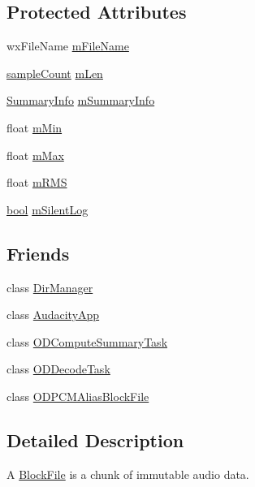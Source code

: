 \subsection*{Protected Attributes}
\begin{DoxyCompactItemize}
\item 
wx\+File\+Name \hyperlink{class_block_file_ab4d7e450d154ad4ccee1d0f4a26093f0}{m\+File\+Name}
\item 
\hyperlink{include_2audacity_2_types_8h_afa427e1f521ea5ec12d054e8bd4d0f71}{sample\+Count} \hyperlink{class_block_file_a732a85cd5906a03310bd23fc91b83d40}{m\+Len}
\item 
\hyperlink{class_summary_info}{Summary\+Info} \hyperlink{class_block_file_a4c81c30a570684d5287ed58acd3da259}{m\+Summary\+Info}
\item 
float \hyperlink{class_block_file_a733757c3a2c9d2e51beab8acbc86f913}{m\+Min}
\item 
float \hyperlink{class_block_file_abda14ef73ea31a585b26e289a99ac356}{m\+Max}
\item 
float \hyperlink{class_block_file_a9b863f624b2d76a5ec29390cebed698f}{m\+R\+MS}
\item 
\hyperlink{mac_2config_2i386_2lib-src_2libsoxr_2soxr-config_8h_abb452686968e48b67397da5f97445f5b}{bool} \hyperlink{class_block_file_a670ed2ad2e13a94e3fb7c2ae32785811}{m\+Silent\+Log}
\end{DoxyCompactItemize}
\subsection*{Friends}
\begin{DoxyCompactItemize}
\item 
class \hyperlink{class_block_file_a0db96e19e318fc03ec706babee75be8f}{Dir\+Manager}
\item 
class \hyperlink{class_block_file_a45d40c2ff4be49563fffa62069e89e7f}{Audacity\+App}
\item 
class \hyperlink{class_block_file_a24c4db9b12ac4619d1b2a0966f0e756c}{O\+D\+Compute\+Summary\+Task}
\item 
class \hyperlink{class_block_file_aee4dd21db513d608a0b91918d594fbbe}{O\+D\+Decode\+Task}
\item 
class \hyperlink{class_block_file_a1927ec7b2f6462da76274870b38d98c3}{O\+D\+P\+C\+M\+Alias\+Block\+File}
\end{DoxyCompactItemize}


\subsection{Detailed Description}
A \hyperlink{class_block_file}{Block\+File} is a chunk of immutable audio data. 

